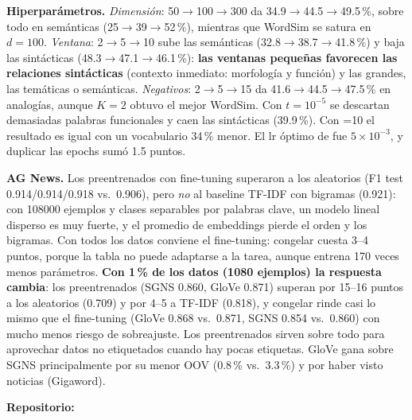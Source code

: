 \documentclass[10pt,letterpaper]{article}
\begin{document}
\textbf{Hiperparámetros.} \emph{Dimensión}: 50$\to$100$\to$300 da 34.9$\to$44.5$\to$49.5\,\%, sobre todo en semánticas
(25$\to$39$\to$52\,\%), mientras que WordSim se satura en $d=100$. \emph{Ventana}: 2$\to$5$\to$10 sube las semánticas
(32.8$\to$38.7$\to$41.8\,\%) y baja las sintácticas (48.3$\to$47.1$\to$46.1\,\%): \textbf{las ventanas pequeñas favorecen
las relaciones sintácticas} (contexto inmediato: morfología y función) y las grandes, las temáticas o semánticas.
\emph{Negativos}: 2$\to$5$\to$15 da 41.6$\to$44.5$\to$47.5\,\% en analogías, aunque $K=2$ obtuvo el mejor WordSim. Con
$t=10^{-5}$ se descartan demasiadas palabras funcionales y caen las sintácticas (39.9\,\%). Con =10 el
resultado es igual con un vocabulario 34\,\% menor. El lr óptimo de  fue $5{\times}10^{-3}$, y duplicar
las epochs sumó 1.5 puntos.

\textbf{AG News.} Los preentrenados con fine-tuning superaron a los aleatorios (F1 test 0.914/0.914/0.918 vs.\ 0.906), pero
\emph{no} al baseline TF-IDF con bigramas (0.921): con \num{108000} ejemplos y clases separables por palabras clave, un modelo
lineal disperso es muy fuerte, y el promedio de embeddings pierde el orden y los bigramas. Con todos los datos conviene el
fine-tuning: congelar cuesta 3--4 puntos, porque la tabla no puede adaptarse a la tarea, aunque entrena 170 veces menos parámetros. \textbf{Con 1\,\% de los datos (\num{1080}
ejemplos) la respuesta cambia}: los preentrenados (SGNS 0.860, GloVe 0.871) superan por 15--16 puntos a los aleatorios
(0.709) y por 4--5 a TF-IDF (0.818), y congelar rinde casi lo mismo que el fine-tuning (GloVe 0.868 vs.\ 0.871, SGNS 0.854
vs.\ 0.860) con mucho menos riesgo de sobreajuste. Los preentrenados sirven sobre todo para aprovechar datos no etiquetados
cuando hay pocas etiquetas. GloVe gana sobre SGNS principalmente por su menor OOV (0.8\,\% vs.\ 3.3\,\%) y
por haber visto noticias (Gigaword).

\textbf{Repositorio:} \repo
\end{document}
